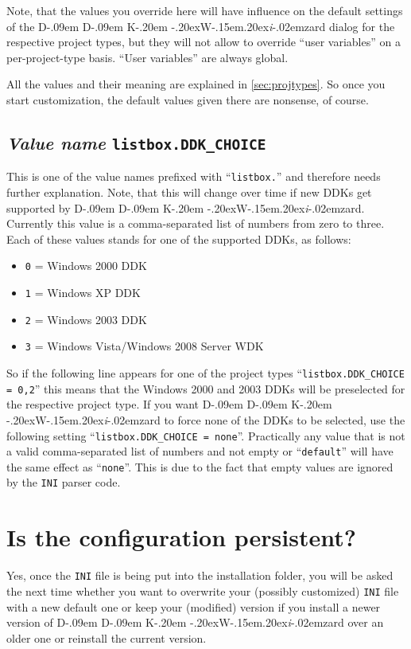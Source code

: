 \documentclass[a4paper,titlepage]{report}
\def\ddkwiz{D\kern-.09em D\kern-.09em K\kern-.20em \raise-.20ex\hbox{W}\kern-.15em\raise.20ex\hbox{\it{i}}\kern-.02em{zard}}
\begin{document}
Note, that the values you override here will have influence on the default settings
of the \ddkwiz{} dialog for the respective project types, but they will not allow
to override ``user variables'' on a per-project-type basis. ``User variables'' are
always global.

All the values and their meaning are explained in \autoref{sec:projtypes}.
So once you start customization, the default values given there are nonsense,
of course.

\subsection{\emph{Value name} \texttt{listbox.DDK\_CHOICE}}
\label{sec:ddkchoice}
This is one of the value names prefixed with ``\texttt{listbox.}'' and therefore
needs further explanation. Note, that this will change over time if new DDKs get
supported by \ddkwiz{}.\\

Currently this value is a comma-separated list of numbers from zero to three.
Each of these values stands for one of the supported DDKs, as follows:

\begin{itemize}
  \item \texttt{0} = Windows 2000 DDK
  \item \texttt{1} = Windows XP DDK
  \item \texttt{2} = Windows 2003 DDK
  \item \texttt{3} = Windows Vista/Windows 2008 Server WDK
\end{itemize}

So if the following line appears for one of the project types ``\verb+listbox.DDK_CHOICE = 0,2+''
this means that the Windows 2000 and 2003 DDKs will be preselected for the respective
project type. If you want \ddkwiz{} to force none of the DDKs to be selected,
use the following setting ``\verb+listbox.DDK_CHOICE = none+''. Practically any value
that is not a valid comma-separated list of numbers and not empty or ``\texttt{default}''
will have the same effect as ``\texttt{none}''. This is due to the fact that empty
values are ignored by the \texttt{INI} parser code.

\section{Is the configuration persistent?}
\label{sec:persistentcfg}
Yes, once the \texttt{INI} file is being put into the installation folder, you will be asked
the next time whether you want to overwrite your (possibly customized) \texttt{INI} file with
a new default one or keep your (modified) version if you install a newer version of
\ddkwiz{} over an older one or reinstall the current version.
\end{document}
